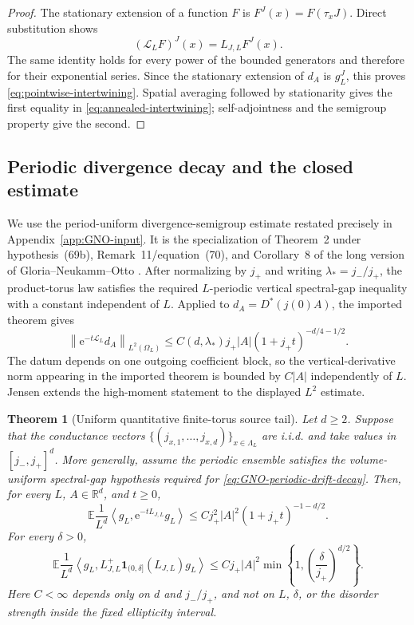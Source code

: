 \documentclass[11pt]{article}
\newtheorem{theorem}{Theorem}[section]
\theoremstyle{definition}
\theoremstyle{remark}
\newcommand{\e}{\mathrm e}
\newcommand{\R}{\mathbb R}
\newcommand{\E}{\mathbb E}
\newcommand{\ip}[2]{\left\langle #1,#2\right\rangle}
\newcommand{\norm}[1]{\left\lVert #1\right\rVert}
\newcommand{\abs}[1]{\left\lvert #1\right\rvert}
\begin{document}
\begin{proof}
The stationary extension of a function $F$ is $F^J(x)=F(\tau_xJ)$.  Direct substitution shows
\[
 (\mathscr L_LF)^J(x)=L_{J,L}F^J(x).
\]
The same identity holds for every power of the bounded generators and therefore for their exponential series.  Since the stationary extension of $d_A$ is $g_L^J$, this proves \eqref{eq:pointwise-intertwining}.  Spatial averaging followed by stationarity gives the first equality in \eqref{eq:annealed-intertwining}; self-adjointness and the semigroup property give the second.
\end{proof}

\subsection{Periodic divergence decay and the closed estimate}

We use the period-uniform divergence-semigroup estimate restated precisely in Appendix~\ref{app:GNO-input}.  It is the specialization of Theorem~2 under hypothesis~(69b), Remark~11/equation~(70), and Corollary~8 of the long version of Gloria--Neukamm--Otto \cite{GloriaNeukammOtto2013Long,GloriaNeukammOtto2015}.  After normalizing by $j_+$ and writing $\lambda_*=j_-/j_+$, the product-torus law satisfies the required $L$-periodic vertical spectral-gap inequality with a constant independent of $L$.  Applied to $d_A=D^*(j(0)A)$, the imported theorem gives
\begin{equation}
 \norm{\e^{-t\mathscr L_L}d_A}_{L^2(\Omega_L)}
 \le C(d,\lambda_*)j_+\abs{A}
 (1+j_+t)^{-d/4-1/2}.
 \label{eq:GNO-periodic-drift-decay}
\end{equation}
The datum depends on one outgoing coefficient block, so the vertical-derivative norm appearing in the imported theorem is bounded by $C\abs A$ independently of $L$.  Jensen extends the high-moment statement to the displayed $L^2$ estimate.

\begin{theorem}[Uniform quantitative finite-torus source tail]
\label{thm:quantitative-finite-torus}
Let $d\ge2$.  Suppose that the conductance vectors
$\{(j_{x,1},\ldots,j_{x,d})\}_{x\in\Lambda_L}$ are i.i.d. and take values in $[j_-,j_+]^d$.  More generally, assume the periodic ensemble satisfies the volume-uniform spectral-gap hypothesis required for \eqref{eq:GNO-periodic-drift-decay}.  Then, for every $L$, $A\in\R^d$, and $t\ge0$,
\begin{equation}
 \boxed{
 \E\frac1{L^d}\ip{g_L}{\e^{-tL_{J,L}}g_L}
 \le Cj_+^2\abs{A}^2(1+j_+t)^{-1-d/2}.}
 \label{eq:uniform-annealed-heat}
\end{equation}
For every $\delta>0$,
\begin{equation}
 \boxed{
 \E\frac1{L^d}\ip{g_L}{L_{J,L}^+
 \bm{1}_{(0,\delta]}(L_{J,L})g_L}
 \le Cj_+\abs{A}^2
 \min\left\{1,\left(\frac{\delta}{j_+}\right)^{d/2}\right\}.}
 \label{eq:uniform-finite-torus-tail}
\end{equation}
Here $C<\infty$ depends only on $d$ and $j_-/j_+$, and not on $L$, $\delta$, or the disorder strength inside the fixed ellipticity interval.
\end{theorem}
\end{document}
